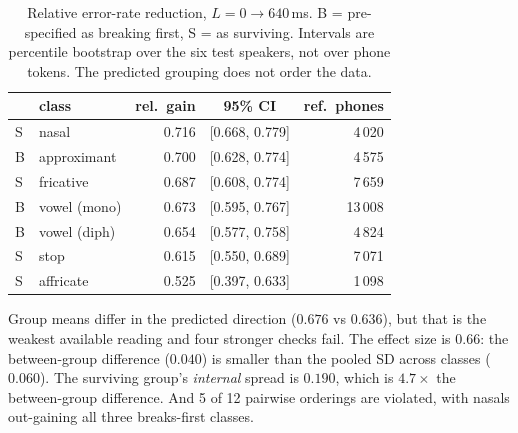 \documentclass[journal]{IEEEtran}
\begin{document}
\begin{table}[t]
\centering\footnotesize
\setlength{\tabcolsep}{4pt}
\renewcommand{\arraystretch}{0.93}
\caption{Relative error-rate reduction, $L{=}0\rightarrow640$\,ms. B =
pre-specified as breaking first, S = as surviving. Intervals are
percentile bootstrap over the six test speakers, not over phone
tokens. The predicted grouping does not order the data.}
\label{tab:h2}
\begin{tabular}{llrcr}
\toprule
& class & rel.\ gain & 95\% CI & ref.\ phones \\
\midrule
S & nasal        & 0.716 & [0.668, 0.779] & 4\,020 \\
B & approximant  & 0.700 & [0.628, 0.774] & 4\,575 \\
S & fricative    & 0.687 & [0.608, 0.774] & 7\,659 \\
B & vowel (mono) & 0.673 & [0.595, 0.767] & 13\,008 \\
B & vowel (diph) & 0.654 & [0.577, 0.758] & 4\,824 \\
S & stop         & 0.615 & [0.550, 0.689] & 7\,071 \\
S & affricate    & 0.525 & [0.397, 0.633] & 1\,098 \\
\bottomrule
\end{tabular}
\end{table}

Group means differ in the predicted direction ($0.676$ vs $0.636$), but that is
the weakest available reading and four stronger checks fail. The effect size
is $0.66$: the between-group difference ($0.040$) is smaller than the pooled SD
across classes ($0.060$). The surviving group's \emph{internal} spread is
$0.190$, which is $4.7\times$ the between-group difference. And 5 of 12 pairwise
orderings are violated, with nasals out-gaining all three breaks-first classes.
\end{document}
